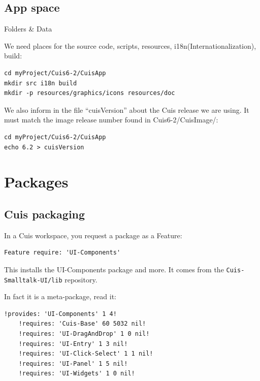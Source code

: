 \documentclass{beamer}
\begin{document}
\subsection{App space}
%
\begin{frame}[fragile]{Folders \& Data}

  We need places for the source code, scripts, resources,
  i18n(Internationalization), build:
\begin{verbatim}
cd myProject/Cuis6-2/CuisApp
mkdir src i18n build
mkdir -p resources/graphics/icons resources/doc
\end{verbatim}

We also inform in the file ``cuisVersion'' about the Cuis release we
are using. It must match the image release number found in
Cuis6-2/CuisImage/:

\begin{verbatim}
cd myProject/Cuis6-2/CuisApp
echo 6.2 > cuisVersion
\end{verbatim}

\end{frame}
%
\section{Packages}
\subsection{Cuis packaging}
\begin{frame}[fragile]
  In a Cuis workspace, you request a package as a Feature:
  \begin{lstlisting}[language=Smalltalk]
    Feature require: 'UI-Components'
  \end{lstlisting}
  This installs the UI-Components package and more. It comes from the
  \texttt{Cuis-Smalltalk-UI/lib} repository.

  \vspace*{10pt}
  In fact it is a meta-package, read it:
  \fontsize{10pt}{8pt}\selectfont
  \begin{lstlisting}[language=Smalltalk]
    !provides: 'UI-Components' 1 4!
    !requires: 'Cuis-Base' 60 5032 nil!
    !requires: 'UI-DragAndDrop' 1 0 nil!
    !requires: 'UI-Entry' 1 3 nil!
    !requires: 'UI-Click-Select' 1 1 nil!
    !requires: 'UI-Panel' 1 5 nil!
    !requires: 'UI-Widgets' 1 0 nil!
  \end{lstlisting}
\end{frame}
\end{document}

